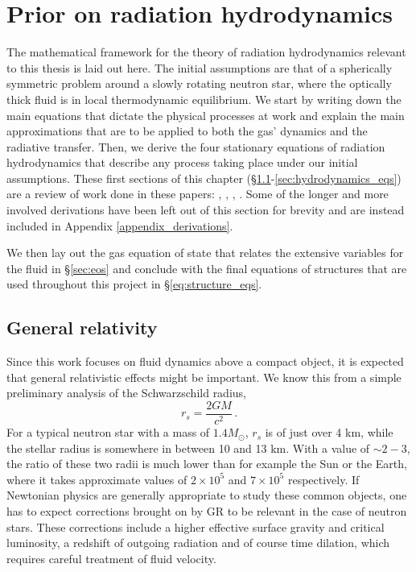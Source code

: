 \documentclass[../main.tex]{subfiles}
\begin{document}
\chapter{Prior on radiation hydrodynamics}\label{chapter2}
The mathematical framework for the theory of radiation hydrodynamics relevant to this thesis is laid out here. The initial assumptions are that of a spherically symmetric problem around a slowly rotating neutron star, where the optically thick fluid is in local thermodynamic equilibrium. We start by writing down the main equations that dictate the physical processes at work and explain the main approximations that are to be applied to both the gas' dynamics and the radiative transfer. Then, we derive the four stationary equations of radiation hydrodynamics that describe any process taking place under our initial assumptions. These first sections of this chapter (\S\ref{sec:GR}-\ref{sec:hydrodynamics_eqs}) are a review of work done in these papers: \citet{Park1993}, \citet{Park2006}, \citet{Thorne1981}, \citet{Flammang1982}. Some of the longer and more involved derivations have been left out of this section for brevity and are instead included in Appendix \ref{appendix_derivations}.

We then lay out the gas equation of state that relates the extensive variables for the fluid in \S\ref{sec:eos} and conclude with the final equations of structures that are used throughout this project in \S\ref{eq:structure_eqs}. 

\section{General relativity}\label{sec:GR}

Since this work focuses on fluid dynamics above a compact object, it is expected that general relativistic effects might be important.  We know this from a simple preliminary analysis of the Schwarzschild radius,
\begin{equation}
    r_s=\frac{2GM}{c^2}\,.
\end{equation}
For a typical neutron star with a mass of $1.4 M_\odot$, $r_s$ is of just over 4 km, while the stellar radius is somewhere in between 10 and 13 km.  With a value of $\sim 2-3$, the ratio of these two radii is much lower than for example the Sun or the Earth, where it takes approximate values of  $2\times 10^5$ and $7\times 10^5$ respectively.  If Newtonian physics are generally appropriate to study these common objects, one has to expect corrections brought on by GR to be relevant in the case of neutron stars.  These corrections include a higher effective surface gravity and critical luminosity, a redshift of outgoing radiation and of course time dilation, which requires careful treatment of fluid velocity. 
\end{document}

